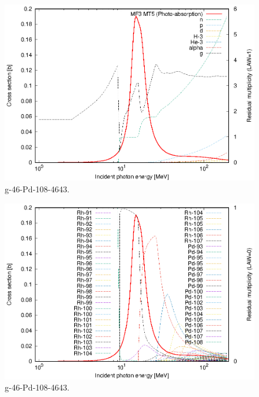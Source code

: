 \begin{figure}
 \includegraphics[width=\linewidth]{eps/g_46-Pd-108_4643.eps}
  \caption{g-46-Pd-108-4643.}
\end{figure}
\begin{figure}
 \includegraphics[width=\linewidth]{eps-law0/g_46-Pd-108_4643.eps}
 \caption{g-46-Pd-108-4643.}
\end{figure}
\newpage \clearpage

